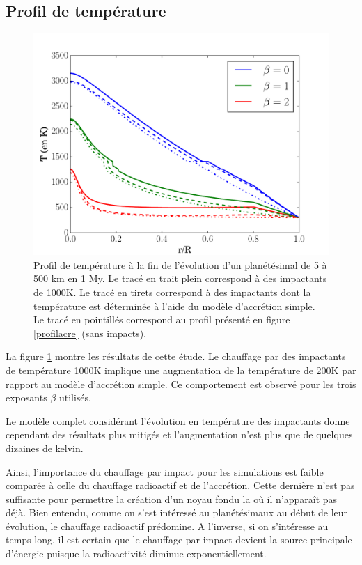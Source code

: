 \documentclass[10pt,a4paper]{article}
\numberwithin{equation}{section}
\begin{document}
\label{impactant}
\subsection{Profil de température}

\begin{figure}[h]
    \centering	    
	\includegraphics[scale=0.45]{figures/impact2.pdf}
    \caption{Profil de température à la fin de l'évolution d'un planétésimal de 5 à 500 km en 1 My. Le tracé en trait plein correspond à des impactants de 1000K. Le tracé en tirets correspond à des impactants dont la température est déterminée à l'aide du modèle d'accrétion simple.  Le tracé en pointillés correspond au profil présenté en figure \ref{profilacre} (sans impacts).}
    	\label{impact} 
\end{figure}

La figure \ref{impact} montre les résultats de cette étude. Le chauffage par des impactants de température 1000K implique une augmentation de la température de 200K par rapport au modèle d'accrétion simple. Ce comportement est observé pour les trois exposants $\beta$ utilisés.
\medskip

Le modèle complet considérant l'évolution en température des impactants donne cependant des résultats plus mitigés et l'augmentation n'est plus que de quelques dizaines de kelvin.
\medskip

Ainsi, l'importance du chauffage par impact pour les simulations est faible comparée à celle du chauffage radioactif et de l'accrétion. Cette dernière n'est pas suffisante pour permettre la création d'un noyau fondu la où il n'apparaît pas déjà. Bien entendu, comme on s'est intéressé au planétésimaux au début de leur évolution, le chauffage radioactif prédomine. A l'inverse, si on s'intéresse au temps long, il est certain que le chauffage par impact devient la source principale d'énergie puisque la radioactivité diminue exponentiellement. 
\end{document}
